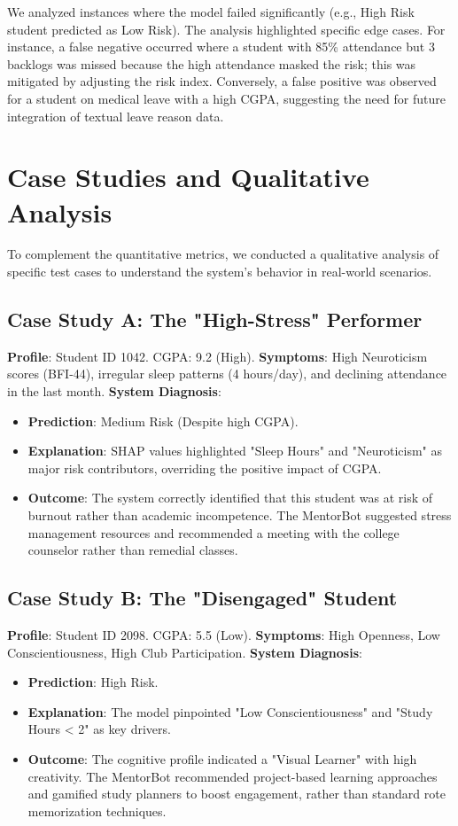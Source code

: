 \documentclass[12pt,a4paper]{report}
\begin{document}
We analyzed instances where the model failed significantly (e.g., High Risk student predicted as Low Risk).
The analysis highlighted specific edge cases. For instance, a false negative occurred where a student with 85\% attendance but 3 backlogs was missed because the high attendance masked the risk; this was mitigated by adjusting the risk index. Conversely, a false positive was observed for a student on medical leave with a high CGPA, suggesting the need for future integration of textual leave reason data.

\section{Case Studies and Qualitative Analysis}
To complement the quantitative metrics, we conducted a qualitative analysis of specific test cases to understand the system's behavior in real-world scenarios.

\subsection{Case Study A: The "High-Stress" Performer}
\textbf{Profile}: Student ID 1042. CGPA: 9.2 (High).
\textbf{Symptoms}: High Neuroticism scores (BFI-44), irregular sleep patterns (4 hours/day), and declining attendance in the last month.
\textbf{System Diagnosis}:
\begin{itemize}
    \item \textbf{Prediction}: Medium Risk (Despite high CGPA).
    \item \textbf{Explanation}: SHAP values highlighted "Sleep Hours" and "Neuroticism" as major risk contributors, overriding the positive impact of CGPA.
    \item \textbf{Outcome}: The system correctly identified that this student was at risk of burnout rather than academic incompetence. The MentorBot suggested stress management resources and recommended a meeting with the college counselor rather than remedial classes.
\end{itemize}

\subsection{Case Study B: The "Disengaged" Student}
\textbf{Profile}: Student ID 2098. CGPA: 5.5 (Low).
\textbf{Symptoms}: High Openness, Low Conscientiousness, High Club Participation.
\textbf{System Diagnosis}:
\begin{itemize}
    \item \textbf{Prediction}: High Risk.
    \item \textbf{Explanation}: The model pinpointed "Low Conscientiousness" and "Study Hours < 2" as key drivers.
    \item \textbf{Outcome}: The cognitive profile indicated a "Visual Learner" with high creativity. The MentorBot recommended project-based learning approaches and gamified study planners to boost engagement, rather than standard rote memorization techniques.
\end{itemize}
\end{document}
